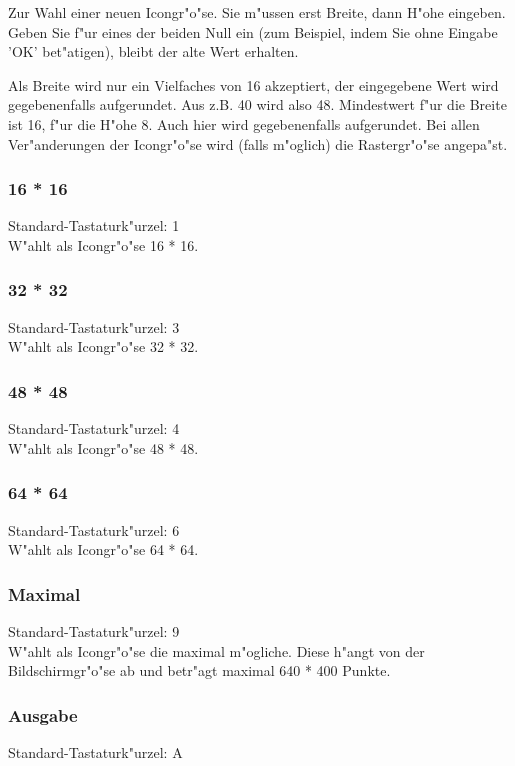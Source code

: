 Zur Wahl einer neuen Icongr"o"se. Sie m"ussen erst Breite, dann H"ohe
eingeben. Geben Sie f"ur eines der beiden Null ein (zum Beispiel,
indem Sie ohne Eingabe 'OK' bet"atigen), bleibt der alte Wert 
erhalten.

Als Breite wird nur ein Vielfaches von 16 akzeptiert, der 
eingegebene Wert wird gegebenenfalls aufgerundet. Aus z.B. 40 wird 
also 48. Mindestwert f"ur die Breite ist 16, f"ur die H"ohe 8.
Auch hier wird gegebenenfalls aufgerundet. Bei allen 
Ver"anderungen der Icongr"o"se wird (falls m"oglich) die Rastergr"o"se 
angepa"st.

\subsubsection{16 * 16}
Standard-Tastaturk"urzel: 1 \\ 
W"ahlt als Icongr"o"se 16 * 16.

\subsubsection{32 * 32}
Standard-Tastaturk"urzel: 3 \\ 
W"ahlt als Icongr"o"se 32 * 32.

\subsubsection{48 * 48}
Standard-Tastaturk"urzel: 4 \\ 
W"ahlt als Icongr"o"se 48 * 48.

\subsubsection{64 * 64}
Standard-Tastaturk"urzel: 6 \\ 
W"ahlt als Icongr"o"se 64 * 64.

\subsubsection{Maximal}
Standard-Tastaturk"urzel: 9 \\ 
W"ahlt als Icongr"o"se die maximal m"ogliche. Diese h"angt von 
der Bildschirmgr"o"se ab und betr"agt maximal 640 * 400 Punkte.

\subsubsection{Ausgabe}
Standard-Tastaturk"urzel: {\alternate}A \\
  

